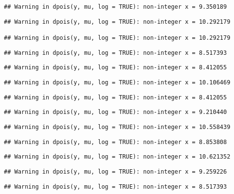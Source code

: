 \documentclass[
]{article}
\begin{document}
\begin{verbatim}
## Warning in dpois(y, mu, log = TRUE): non-integer x = 9.350189
\end{verbatim}

\begin{verbatim}
## Warning in dpois(y, mu, log = TRUE): non-integer x = 10.292179

## Warning in dpois(y, mu, log = TRUE): non-integer x = 10.292179
\end{verbatim}

\begin{verbatim}
## Warning in dpois(y, mu, log = TRUE): non-integer x = 8.517393
\end{verbatim}

\begin{verbatim}
## Warning in dpois(y, mu, log = TRUE): non-integer x = 8.412055
\end{verbatim}

\begin{verbatim}
## Warning in dpois(y, mu, log = TRUE): non-integer x = 10.106469
\end{verbatim}

\begin{verbatim}
## Warning in dpois(y, mu, log = TRUE): non-integer x = 8.412055
\end{verbatim}

\begin{verbatim}
## Warning in dpois(y, mu, log = TRUE): non-integer x = 9.210440
\end{verbatim}

\begin{verbatim}
## Warning in dpois(y, mu, log = TRUE): non-integer x = 10.558439
\end{verbatim}

\begin{verbatim}
## Warning in dpois(y, mu, log = TRUE): non-integer x = 8.853808
\end{verbatim}

\begin{verbatim}
## Warning in dpois(y, mu, log = TRUE): non-integer x = 10.621352
\end{verbatim}

\begin{verbatim}
## Warning in dpois(y, mu, log = TRUE): non-integer x = 9.259226
\end{verbatim}

\begin{verbatim}
## Warning in dpois(y, mu, log = TRUE): non-integer x = 8.517393
\end{verbatim}
\end{document}
